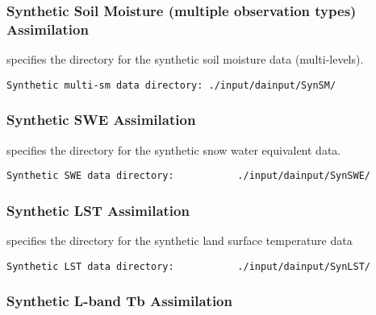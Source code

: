  
 
 \subsubsection{Synthetic Soil Moisture (multiple observation types)
 Assimilation}
 \label{sssec:syntheticmultism}
 

 
  specifies the
 directory for the synthetic soil moisture data (multi-levels).
 

 \begin{Verbatim}[frame=single]
Synthetic multi-sm data directory: ./input/dainput/SynSM/
 \end{Verbatim}
 

 
 
 \subsubsection{Synthetic SWE Assimilation}
 \label{sssec:syntheticswe}
 

 
  specifies the directory
 for the synthetic snow water equivalent data.
 

 \begin{Verbatim}[frame=single]
Synthetic SWE data directory:           ./input/dainput/SynSWE/
 \end{Verbatim}
 

 
 
 \subsubsection{Synthetic LST Assimilation}
 \label{sssec:syntheticlst}
 

 
  specifies the directory
 for the synthetic land surface temperature data
 

 \begin{Verbatim}[frame=single]
Synthetic LST data directory:           ./input/dainput/SynLST/
 \end{Verbatim}
 

 
 
 \subsubsection{Synthetic L-band Tb Assimilation}
 \label{sssec:syntheticlbandtb}
 

